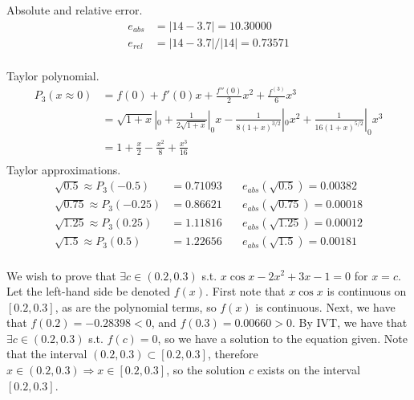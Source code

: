 \documentclass{homework}
\begin{document}
\maketitle

\question
Absolute and relative error.
\begin{align*}
    e_{abs}	&=	 |14 - 3.7|	= \boxed{10.30000} \\
    e_{rel}	&=	 |14 - 3.7|/|14|	= \boxed{0.73571} \\
\end{align*}

\question
Taylor polynomial.
\begin{align*}
    P_3(x \approx 0)	&=	f(0) + f'(0)x + \frac{f''(0)}{2}x^2 + \frac{f^{(3)}}{6}x^3	\\
    	&=	\sqrt{1+x}|_0 + \frac{1}{2\sqrt{1+x}}|_0 x - \frac{1}{8(1+x)^{3/2}}|_0 x^2 + \frac{1}{16(1+x)^{5/2}}|_0x^3	\\
    	&=	\boxed{1 + \frac{x}{2} - \frac{x^2}{8} + \frac{x^3}{16}}	\\
\end{align*}
Taylor approximations.
\begin{align*}
    \sqrt{0.5}	\approx	P_3(-0.5) &= 0.71093     &\quad e_{abs}(\sqrt{0.5}) =  0.00382 \\
    \sqrt{0.75}	\approx	P_3(-0.25) &= 0.86621    &\quad e_{abs}(\sqrt{0.75}) =  0.00018 \\
    \sqrt{1.25}	\approx	P_3(0.25) &= 1.11816     &\quad e_{abs}(\sqrt{1.25}) =  0.00012 \\
    \sqrt{1.5}	\approx	P_3(0.5) &= 1.22656      &\quad e_{abs}(\sqrt{1.5}) =  0.00181 \\
\end{align*}

\question
We wish to prove that $\exists c \in (0.2, 0.3)$ s.t. $x\cos{x} - 2x^2 + 3x - 1 = 0$ for $x = c$. Let the left-hand side be denoted $f(x)$. First note that $x \cos x$ is continuous on $[0.2, 0.3]$, as are the polynomial terms, so $f(x)$ is continuous. Next, we have that $f(0.2) = -0.28398 < 0$, and $f(0.3) = 0.00660 > 0$. By IVT, we have that $\exists c \in (0.2, 0.3)$ s.t. $f(c) = 0$, so we have a solution to the equation given. Note that the interval $(0.2, 0.3) \subset [0.2, 0.3]$, therefore $x \in (0.2, 0.3) \Rightarrow x \in [0.2, 0.3]$, so the solution $c$ exists on the interval $[0.2, 0.3]$.
\end{document}
